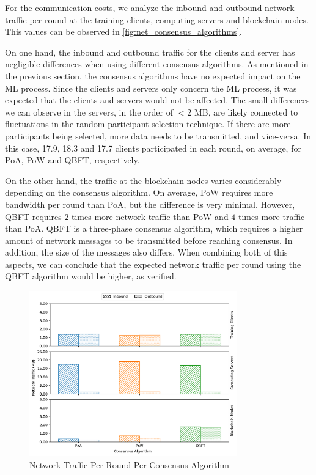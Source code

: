 For the communication costs, we analyze the inbound and outbound network traffic per round at the training clients, computing servers and blockchain nodes. This values can be observed in \autoref{fig:net_consensus_algorithms}.

On one hand, the inbound and outbound traffic for the clients and server has negligible differences when using different consensus algorithms. As mentioned in the previous section, the consensus algorithms have no expected impact on the ML process. Since the clients and servers only concern the ML process, it was expected that the clients and servers would not be affected. The small differences we can observe in the servers, in the order of $< 2$ MB, are likely connected to fluctuations in the random participant selection technique. If there are more participants being selected, more data needs to be transmitted, and vice-versa. In this case, 17.9, 18.3 and 17.7 clients participated in each round, on average, for PoA, PoW and QBFT, respectively.

On the other hand, the traffic at the blockchain nodes varies considerably depending on the consensus algorithm. On average, PoW requires more bandwidth per round than PoA, but the difference is very minimal. However, QBFT requires $2$ times more network traffic than PoW and $4$ times more traffic than PoA. QBFT is a three-phase consensus algorithm, which requires a higher amount of network messages to be transmitted before reaching consensus. In addition, the size of the messages also differs. When combining both of this aspects, we can conclude that the expected network traffic per round using the QBFT algorithm would be higher, as verified.

\begin{figure}[!ht]
    \centering
    \centering
    \includegraphics[width=0.8\textwidth]{graphics/consensus/net.pdf}
    \caption{Network Traffic Per Round Per Consensus Algorithm}
    \label{fig:net_consensus_algorithms}
\end{figure}


